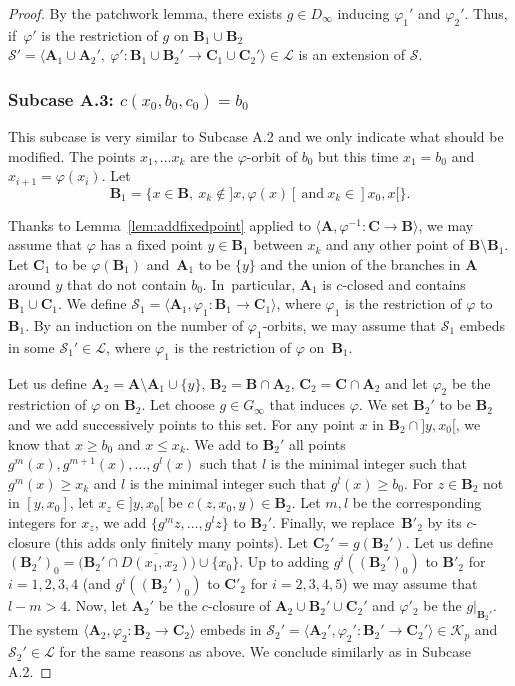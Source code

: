 \documentclass[JEP,XML,SOM,Unicode,NoFloatCountersInSection]{cedram}
\let\mathcal\mathscr
\theoremstyle{plain}
\theoremstyle{definition}
\newcommand{\bA}{{\boldsymbol{A}}}
\newcommand{\bB}{{\boldsymbol{B}}}
\newcommand{\bC}{{\boldsymbol{C}}}
\newcommand{\cK}{\mathcal{K}}
\newcommand{\cL}{\mathcal{L}}
\newcommand{\cS}{\mathcal{S}}
\begin{document}
\begin{proof}
By the patchwork lemma, there exists $g\in D_\infty$ inducing $\varphi_1'$ and $\varphi_2'$. Thus, if~$\varphi'$ is the restriction of $g$ on $\bB_1\cup\bB_2$ $\cS'=\langle \bA_1\cup\bA_2',\ \varphi'\colon \bB_1\cup\bB_2'\to\bC_1\cup\bC_2'\rangle\in\cL$ is an extension of $\cS$.

\subsubsection*{Subcase \textup{A.3:} $c(x_0,b_0,c_0)=b_0$}
This subcase is very similar to Subcase A.2 and we only indicate what should be modified. The points $x_1,\dots x_k$ are the $\varphi$-orbit of $b_0$ but this time $x_1=b_0$ and $x_{i+1}=\varphi(x_i)$. Let
\[
\bB_1=\{x\in \bB,\ x_k\notin{}]x,\varphi(x)[ \ \textrm{and}\ x_k\in{}]x_0,x[\}.
\]

Thanks to Lemma~\ref{lem:addfixedpoint} applied to $\langle \bA,\varphi^{-1}\colon \bC\to\bB\rangle$, we may assume that $\varphi$ has a fixed point $y\in\bB_1$ between $x_k$ and any other point of $\bB\setminus\bB_1$. Let $\bC_1$ to be $\varphi(\bB_1)$ and~$\bA_1$ to be $\{y\}$ and the union of the branches in $\bA$ around $y$ that do not contain $b_0$. In~particular, $\bA_1$ is $c$-closed and contains $\bB_1\cup\bC_1$. We define \hbox{$\cS_1=\langle\bA_1, \varphi_1\colon \bB_1\to\bC_1\rangle$}, where $\varphi_1$ is the restriction of $\varphi$ to $\bB_1$. By an induction on the number of $\varphi_1$-orbits, we may assume that $\cS_1$ embeds in some $\cS_1'\in\cL$, where $\varphi_1$ is the restriction of $\varphi$ on~$\bB_1$.

Let us define $\bA_2=\bA\setminus \bA_1\cup\{y\}$, $\bB_2=\bB\cap \bA_2$, $\bC_2=\bC\cap\bA_2$ and let $\varphi_2$ be the restriction of $\varphi$ on $\bB_2$. Let choose $g\in G_\infty$ that induces $\varphi$. We set $\bB_2'$ to be $\bB_2$ and we add successively points to this set. For any point $x$ in $\bB_2\cap{}]y,x_0[$, we know that $x\geq b_0$ and $x\leq x_k$. We add to $\bB_2'$ all points $g^m(x),g^{m+1}(x),\dots,g^l(x)$ such that $l$ is the minimal integer such that $g^m(x)\geq x_k$ and $l$ is the minimal integer such that $g^l(x)\geq b_0$. For $z\in \bB_2$ not in $[y,x_0]$, let $x_z\in{}]y,x_0[$ be $c(z,x_0,y)\in \bB_2$. Let $m,l$ be the corresponding integers for $x_z$, we add $\{g^m{z},\dots,g^l{z}\}$ to $\bB_2'$. Finally, we replace~$\bB'_2$ by its $c$-closure (this adds only finitely many points). Let $\bC_2'=g(\bB_2')$. Let us define $(\bB_2')_0=\bigl(\bB_2'\cap \overline{D(x_1,x_2)}\bigr)\cup\{x_0\}$. Up to adding $g^i((\bB_2')_0)$ to $\bB'_2$ for $i=1,2,3,4$ (and $g^i((\bB_2')_0)$ to $\bC'_2$ for $i=2,3,4,5$) we may assume that $l-m>4$. Now, let $\bA_2'$ be the $c$-closure of $\bA_2\cup\bB_2'\cup\bC_2'$ and $\varphi'_2$ be the $g|_{\bB_2'}$. The system $\langle \bA_2, \varphi_2\colon\bB_2\to\bC_2\rangle$ embeds in $\cS_2'=\langle \bA_2', \varphi_2'\colon\bB_2'\to\bC_2'\rangle\in\cK_p$ and $\cS_2'\in\cL$ for the same reasons as above. We conclude similarly as in Subcase A.2.



\end{proof}
\end{document}
